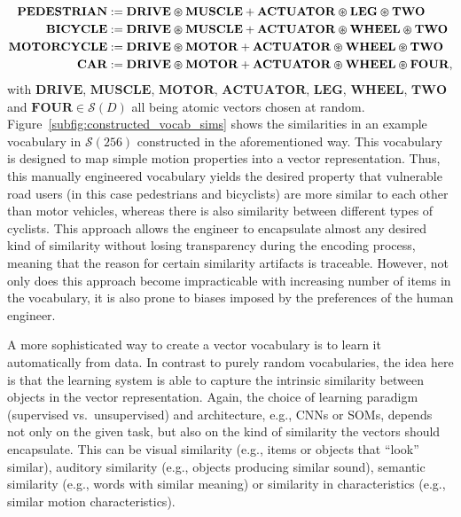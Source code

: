 \begin{align*}
\mathbf{PEDESTRIAN} &:= \mathbf{DRIVE} \varoast \mathbf{MUSCLE} + \mathbf{ACTUATOR} \varoast \mathbf{LEG} \varoast \mathbf{TWO} \\
\mathbf{BICYCLE} &:= \mathbf{DRIVE} \varoast \mathbf{MUSCLE} + \mathbf{ACTUATOR} \varoast \mathbf{WHEEL} \varoast \mathbf{TWO}\\
\mathbf{MOTORCYCLE} &:= \mathbf{DRIVE} \varoast \mathbf{MOTOR} + \mathbf{ACTUATOR} \varoast \mathbf{WHEEL} \varoast \mathbf{TWO}\\
\mathbf{CAR} &:= \mathbf{DRIVE} \varoast \mathbf{MOTOR} + \mathbf{ACTUATOR} \varoast \mathbf{WHEEL} \varoast \mathbf{FOUR},
\end{align*}
with $\mathbf{DRIVE}$, $\mathbf{MUSCLE}$, $\mathbf{MOTOR}$, $\mathbf{ACTUATOR}$, $\mathbf{LEG}$, $\mathbf{WHEEL}$, $\mathbf{TWO}$ and $\mathbf{FOUR} \in \mathcal{S}(D)$ all being atomic vectors chosen at random.
Figure~\ref{subfig:constructed_vocab_sims} shows the similarities in an example vocabulary in $\mathcal{S}(256)$ constructed in the aforementioned way.
This vocabulary is designed to map simple motion properties into a vector representation.
Thus, this manually engineered vocabulary yields the desired property that vulnerable road users (in this case pedestrians and bicyclists) are more similar to each other than motor vehicles, whereas there is also similarity between different types of cyclists.
This approach allows the engineer to encapsulate almost any desired kind of similarity without losing transparency during the encoding process, meaning that the reason for certain similarity artifacts is traceable.
However, not only does this approach become impracticable with increasing number of items in the vocabulary, it is also prone to biases imposed by the preferences of the human engineer.

A more sophisticated way to create a vector vocabulary is to learn it automatically from data.
In contrast to purely random vocabularies, the idea here is that the learning system is able to capture the intrinsic similarity between objects in the vector representation.
Again, the choice of learning paradigm (supervised vs.\ unsupervised) and architecture, e.g., \acp{CNN} or \acp{SOM}, depends not only on the given task, but also on the kind of similarity the vectors should encapsulate.
This can be visual similarity (e.g., items or objects that \enquote{look} similar), auditory similarity (e.g., objects producing similar sound), semantic similarity (e.g., words with similar meaning) or similarity in characteristics (e.g., similar motion characteristics).

